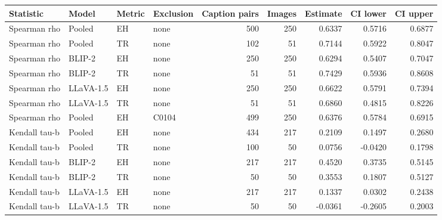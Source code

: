 \begin{tabular}{llllrrrrr}
\toprule
Statistic & Model & Metric & Exclusion & Caption pairs & Images & Estimate & CI lower & CI upper \\
\midrule
Spearman rho & Pooled & EH & none & 500 & 250 & 0.6337 & 0.5716 & 0.6877 \\
Spearman rho & Pooled & TR & none & 102 & 51 & 0.7144 & 0.5922 & 0.8047 \\
Spearman rho & BLIP-2 & EH & none & 250 & 250 & 0.6294 & 0.5407 & 0.7047 \\
Spearman rho & BLIP-2 & TR & none & 51 & 51 & 0.7429 & 0.5936 & 0.8608 \\
Spearman rho & LLaVA-1.5 & EH & none & 250 & 250 & 0.6622 & 0.5791 & 0.7394 \\
Spearman rho & LLaVA-1.5 & TR & none & 51 & 51 & 0.6860 & 0.4815 & 0.8226 \\
Spearman rho & Pooled & EH & C0104 & 499 & 250 & 0.6376 & 0.5784 & 0.6915 \\
Kendall tau-b & Pooled & EH & none & 434 & 217 & 0.2109 & 0.1497 & 0.2680 \\
Kendall tau-b & Pooled & TR & none & 100 & 50 & 0.0756 & -0.0420 & 0.1798 \\
Kendall tau-b & BLIP-2 & EH & none & 217 & 217 & 0.4520 & 0.3735 & 0.5145 \\
Kendall tau-b & BLIP-2 & TR & none & 50 & 50 & 0.3553 & 0.1807 & 0.5127 \\
Kendall tau-b & LLaVA-1.5 & EH & none & 217 & 217 & 0.1337 & 0.0302 & 0.2438 \\
Kendall tau-b & LLaVA-1.5 & TR & none & 50 & 50 & -0.0361 & -0.2605 & 0.2003 \\
\bottomrule
\end{tabular}
